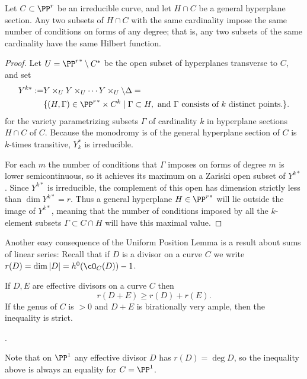 \begin{corollary}
Let $C\subset \PP^r$ be an irreducible curve, and let $H\cap C$ be a general hyperplane section. Any two subsets of $H\cap C$ with the same cardinality impose the same number of conditions on forms of any degree; that is, any two subsets of the same cardinality have the same Hilbert function.
\end{corollary}

\begin{proof} Let $U = {\PP^r}^* \setminus C^*$ be the open subset of hyperplanes transverse to $C$, and set
\begin{align*}
 Y^{k*} :=&Y\times_U Y\times_U \cdots Y\times_U \setminus \Delta  =\\
                                                 & \{ (H, \Gamma) \in {\PP^r}^* \times C^k \mid \Gamma \subset H, \hbox{ and $\Gamma$ consists of $k$ distinct points.}\}.
\end{align*}
for the variety parametrizing subsets $\Gamma$ of cardinality $k$ in hyperplane sections $H \cap C$ of $C$. Because the monodromy is of the general hyperplane section of $C$ is
$k$-times transitive, $Y_k^*$ is irreducible.

For each $m$ the number of conditions that $\Gamma$ imposes on forms of degree $m$ is lower semicontinuous, so it achieves its maximum on a Zariski open subset of $Y^{k*}$. Since $Y^{k*}$ is irreducible, the complement of this open has dimension strictly less than $\dim Y^{k*} = r$. Thus a general hyperplane $H \in {\PP^r}^*$ will lie outside the image of $Y^{k*}$, meaning that the number of conditions imposed by all the $k$-element subsets $\Gamma \subset C \cap H$ will have this maximal value.
\end{proof}

Another easy consequence of the Uniform Position Lemma is a result about sums of linear series:
Recall that if $D$ is a divisor on a curve $C$ we write $r(D) = \dim |D| = h^0(\cO_C(D))-1$.

\begin{corollary}\label{Clifford equality plus}
If $D,E$ are effective divisors on a curve $C$ then
$$
r(D+E) \geq r(D)+r(E).
$$
If the genus of $C$ is $>0$ and $D+E$ is birationally very ample, then the inequality is strict.
\end{corollary}.

Note that on $\PP^1$ any effective divisor $D$ has $r(D) = \deg D$, so the inequality above is
always an equality for $C = \PP^1$.

